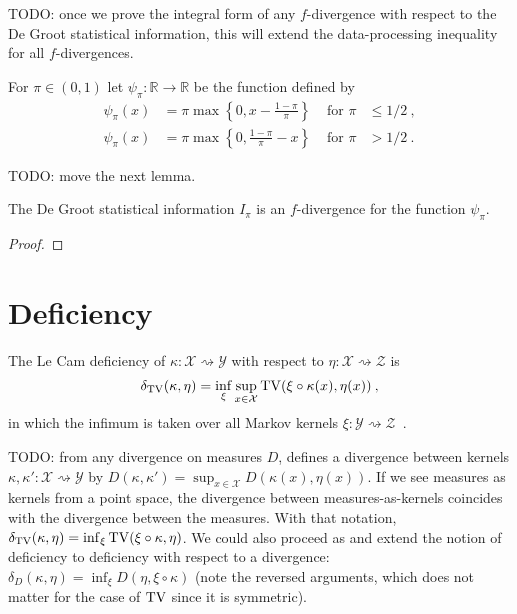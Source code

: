 TODO: once we prove the integral form of any $f$-divergence with respect to the De Groot statistical information, this will extend the data-processing inequality for all $f$-divergences. 

\begin{definition}
  \label{def:deGrootFun}
  \uses{}
  For $\pi \in (0,1)$ let $\psi_\pi : \mathbb{R} \to \mathbb{R}$ be the function defined by
  \begin{align*}
  \psi_\pi(x) &= \pi \max\left\{0, x - \frac{1 - \pi}{\pi}\right\} & \text{ for } \pi &\le 1/2 \: ,
  \\
  \psi_\pi(x) &= \pi \max\left\{0, \frac{1 - \pi}{\pi} - x\right\} & \text{ for } \pi &> 1/2 \: .
  \end{align*}
\end{definition}

TODO: move the next lemma.

\begin{lemma}
  \label{lem:deGrootInfo_eq_fDiv}
  The De Groot statistical information $I_\pi$ is an $f$-divergence for the function $\psi_\pi$.
\end{lemma}

\begin{proof}%
\uses{}

\end{proof}

\section{Deficiency}

\begin{definition}
  \label{def:deficiency}
  The Le Cam deficiency of $\kappa : \mathcal X \rightsquigarrow \mathcal Y$ with respect to $\eta : \mathcal X \rightsquigarrow \mathcal Z$ is
  \begin{align*}
  \delta_{\operatorname{TV}}(\kappa, \eta) = \inf_{\xi} \sup_{x \in \mathcal X} \operatorname{TV}(\xi \circ \kappa (x), \eta(x)) \: ,
  \end{align*}
  in which the infimum is taken over all Markov kernels $\xi : \mathcal Y \rightsquigarrow \mathcal Z$~.
\end{definition}

TODO: from any divergence on measures $D$, \cite{perrone2023markov} defines a divergence between kernels $\kappa, \kappa' : \mathcal X \rightsquigarrow \mathcal Y$ by $D(\kappa, \kappa') = \sup_{x \in \mathcal X} D(\kappa(x), \eta(x))$.
If we see measures as kernels from a point space, the divergence between measures-as-kernels coincides with the divergence between the measures.
With that notation, $\delta_{\operatorname{TV}}(\kappa, \eta) = \inf_{\xi} \operatorname{TV}(\xi \circ \kappa, \eta)$.
We could also proceed as \cite{raginsky2011shannon} and extend the notion of deficiency to deficiency with respect to a divergence: $\delta_D(\kappa, \eta) = \inf_{\xi} D(\eta, \xi\circ\kappa)$ (note the reversed arguments, which does not matter for the case of $\operatorname{TV}$ since it is symmetric).

